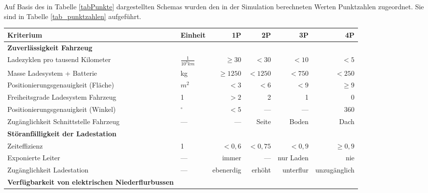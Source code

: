 Auf Basis des in Tabelle \ref{tabPunkte} dargestellten Schemas wurden den in der Simulation berechneten Werten Punktzahlen zugeordnet. Sie sind in Tabelle \ref{tab_punktzahlen} aufgeführt.

\begin{table}
	\centering
	\begin{tabulary}{\linewidth}{LLrrrr}
		\toprule
		Kriterium                                                & Einheit              &         1P &      2P &        3P &           4P \\ \midrule
		\textbf{Zuverlässigkeit Fahrzeug}                        &                      &            &         &           &  \\
		Ladezyklen pro tausend Kilometer                         & $\frac{1}{10^{3}km}$ &   $\ge 30$ &   $<30$ &     $<10$ &         $<5$ \\
		Masse Ladesystem + Batterie                              & kg                   & $\ge 1250$ & $<1250$ &    $<750$ &       $<250$ \\
		Positionierungsgenauigkeit (Fläche)                      & $m^2$                &       $<3$ &    $<6$ &      $<9$ &      $\ge 9$ \\
		Freiheitsgrade Ladesystem Fahrzeug                       & 1                    &       $>2$ &       2 &         1 &            0 \\
		Positionierungsgenauigkeit (Winkel)                      & $^\circ$             &       $<5$ &     --- &       --- &        $360$ \\
		Zugänglichkeit Schnittstelle Fahrzeug                    & ---                  &        --- &   Seite &     Boden &         Dach \\ \midrule
		\textbf{Störanfälligkeit der Ladestation}                &                      &            &         &           &  \\
		Zeiteffizienz                                            & 1                    &     $<0,6$ & $<0,75$ &    $<0,9$ &    $\ge 0,9$ \\
		Exponierte Leiter                                        & ---                  &      immer &     --- & nur Laden &          nie \\
		Zugänglichkeit Ladestation                               & ---                  &  ebenerdig &  erhöht & unterflur & unzugänglich \\ \midrule
		\textbf{Verfügbarkeit von elektrischen Niederflurbussen} &                      &            &         &           &  \\

\end{tabulary}
\end{table}
